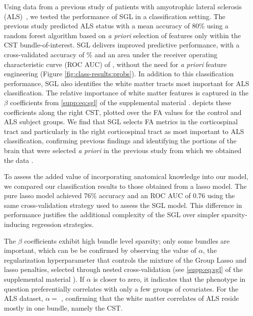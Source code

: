 \documentclass[10pt,%
               aps,%
               prl,%
               reprint,%
               superscriptaddress,%
               preprintnumbers,%
               linenumbers,%
               amsmath,%
               floatfix]{revtex4-1}
\begin{document}
Using data from a previous study of patients with amyotrophic lateral sclerosis (ALS)~\cite{sarica2017corticospinal}, we tested the performance of SGL in a
classification setting. The previous study predicted ALS status with a mean
accuracy of 80\% using a random forest algorithm based on \emph{a priori}
selection of features only within the CST bundle-of-interest.
SGL delivers improved predictive performance, with a cross-validated accuracy
of {\alsAccuracy}\% and an area under the receiver operating characteristic
curve (ROC AUC) of {\alsRocAuc}, without the need for \emph{a priori} feature
engineering (Figure \cref{fig:class-results:probs}). In addition to this
classification performance, SGL also identifies the white matter tracts most
important for ALS classification. The relative importance of white matter
features is captured in the $\beta$ coefficients from \cref{supp:eq:sgl} of
the supplemental material \cite{supplement}.
 depicts these coefficients along the
right CST, plotted over the FA values for the control and ALS subject groups.
We find that SGL selects FA metrics in the corticospinal tract and
particularly in the right corticospinal tract as most important to ALS
classification, confirming previous findings \cite{van2011upper,
toosy2003diffusion, sarica2014tractography, sage2007quantitative,
sage2009quantitative, karlsborg2004corticospinal, ellis1999diffusion,
cosottini2005diffusion, ciccarelli2009investigation, abe2010voxel} and
identifying the portions of the brain that were selected \emph{a priori} in
the previous study from which we obtained the data
\cite{sarica2017corticospinal}.

To assess the added value of incorporating anatomical knowledge into our
model, we compared our classification results to those obtained from a lasso
model. The pure lasso model achieved 76\% accuracy and an ROC AUC of 0.76
using the same cross-validation strategy used to assess the SGL model. This
difference in performance justifies the additional complexity of the SGL over
simpler sparsity-inducing regression strategies.

The $\beta$ coefficients exhibit high bundle level sparsity; only some
bundles are important, which can be be confirmed by observing the value of
$\alpha$, the regularization hyperparameter that controls the mixture of the
Group Lasso and lasso penalties, selected through nested cross-validation
(see \cref{supp:eq:sgl} of the supplemental material \cite{supplement}).
If $\alpha$ is closer to zero, it indicates that the phenotype in question
preferentially correlates with only a few groups of covariates. For the ALS
dataset, $\alpha = $ \alsLRatio, confirming that the white matter correlates
of ALS reside mostly in one bundle, namely the CST.
\end{document}
